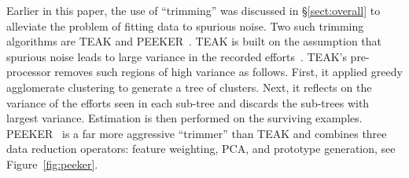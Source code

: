 \documentclass{sig-alternate}
\newcommand{\tion}[1]{\S\ref{sect:#1}}
\newcommand{\fig}[1]{Figure~\ref{fig:#1}}
\begin{document}
Earlier in this paper,   the use of ``trimming'' was discussed in \tion{overall}
to alleviate the problem of fitting   data to spurious noise. 
Two such trimming algorithms are TEAK and PEEKER~\cite{koc11b,papa13}. TEAK is built
on the assumption that spurious noise leads to large variance in the recorded efforts~\cite{koc11b}.
TEAK's pre-processor removes such regions of high variance as follows.
First, it  applied greedy agglomerate clustering  to generate a tree of clusters.
Next, it reflects on the variance
of the efforts seen in each sub-tree and discards the sub-trees with largest variance. Estimation is then performed
on the surviving examples.
PEEKER~\cite{papa13} is a far more aggressive ``trimmer'' than TEAK and combines three data reduction operators:
feature weighting, PCA, and prototype generation, see \fig{peeker}.
\end{document}
